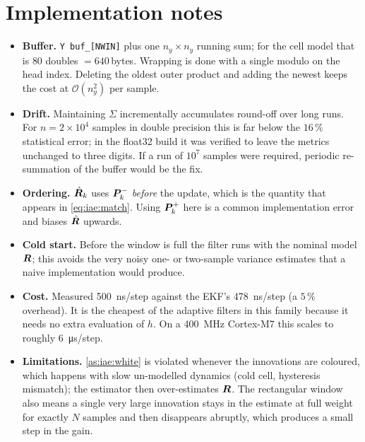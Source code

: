 \section{Implementation notes}
\begin{itemize}[leftmargin=1.4em]
\item \textbf{Buffer.}  \texttt{Y buf\_[NWIN]} plus one $n_y\times n_y$ running sum; for the cell
      model that is $80$ doubles $=640$\,bytes.  Wrapping is done with a single modulo on the
      head index.  Deleting the oldest outer product and adding the newest keeps the cost at
      $\mathcal{O}(n_y^2)$ per sample.
\item \textbf{Drift.}  Maintaining $\Sigma$ incrementally accumulates round-off over long runs.  For
      $n=2\times10^4$ samples in double precision this is far below the $16\,\%$ statistical error;
      in the float32 build it was verified to leave the metrics unchanged to three digits.  If a
      run of $10^7$ samples were required, periodic re-summation of the buffer would be the fix.
\item \textbf{Ordering.}  $\hat{\bm{R}}_k$ uses $\bm{P}^{-}_k$ \emph{before} the update, which is the
      quantity that appears in \eqref{eq:iae:match}.  Using $\bm{P}^{+}_k$ here is a common
      implementation error and biases $\hat{\bm{R}}$ upwards.
\item \textbf{Cold start.}  Before the window is full the filter runs with the nominal model $\bm{R}$;
      this avoids the very noisy one- or two-sample variance estimates that a naive implementation
      would produce.
\item \textbf{Cost.}  Measured \SI{500}{\nano\second}/step against the EKF's
      \SI{478}{\nano\second}/step (a $5\,\%$ overhead).  It is the cheapest of the adaptive filters in
      this family because it needs no extra evaluation of $h$.  On a \SI{400}{\mega\hertz} Cortex-M7
      this scales to roughly \SI{6}{\micro\second}/step.
\item \textbf{Limitations.}  \cref{as:iae:white} is violated whenever the innovations are coloured,
      which happens with slow un-modelled dynamics (cold cell, hysteresis mismatch); the estimator
      then over-estimates $\bm{R}$.  The rectangular window also means a single very large innovation
      stays in the estimate at full weight for exactly $N$ samples and then disappears abruptly,
      which produces a small step in the gain.
\end{itemize}


